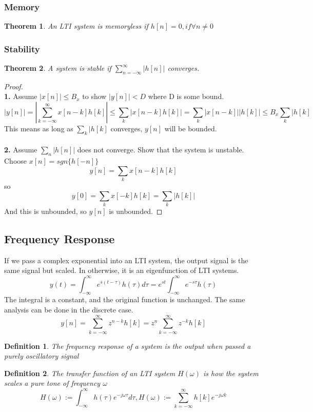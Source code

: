 \documentclass{article}
\newtheorem{theorem}{Theorem}
\newtheorem{definition}{Definition}
\newtheorem{proof}{Proof}
\begin{document}
\subsubsection{Memory}
\begin{theorem}
    An LTI system is memoryless if $h[n]=0, if \forall n \ne 0$
\end{theorem}
\subsubsection{Stability}
\begin{theorem}
    A system is stable if $\sum_{n=-\infty}^{\infty}{|h[n]|}$ converges.
\end{theorem}
\begin{proof}
    \textbf{\\1. } Assume $|x[n]| \le B_x$ to show $|y[n]| < D$ where D is some bound.
    $$|y[n]| = |\sum_{k=-\infty}^{\infty}{x[n-k]h[k]}| \le \sum_{k}{|x[n-k]h[k]|} = \sum_{k}{|x[n-k]||h[k]|}\le B_x\sum_{k}{|h[k]}$$
    This means as long as $\sum_{k}{|h[k]}$ converges, $y[n]$ will be bounded.\\
    \textbf{\\2. } Assume $\sum_{n}{|h[n]|}$ does not converge. Show that the system is unstable.
    Choose $x[n]=sgn\{h[-n]\}$
    $$y[n]=\sum_{k}{x[n-k]h[k]}$$ so 
    $$y[0] = \sum_{k}{x[-k]h[k]} = \sum_{k}{|h[k]|}$$
    And this is unbounded, so $y[n]$ is unbounded.
\end{proof}
\subsection{Frequency Response}
If we pass a complex exponential into an LTI system, the output signal is the same signal but scaled.
In otherwise, it is an eigenfunction of LTI systems.
$$y(t)=\int_{-\infty}^{\infty}{e^{s(t-\tau)}h(\tau)d\tau}=e^{st}\int_{-\infty}^{\infty}{e^{-s\tau}h(\tau)}$$
The integral is a constant, and the original function is unchanged.
The same analysis can be done in the discrete case.
$$y[n]=\sum_{k=-\infty}^{\infty}z^{n-k}h[k] = z^n \sum_{k=-\infty}^{\infty}z^{-k}h[k]$$
\begin{definition}
    The frequency response of a system is the output when passed a purely oscillatory signal
\end{definition}
\begin{definition}
    The transfer function of an LTI system $H(\omega)$ is how the system scales a pure tone of frequency $\omega$
    $$H(\omega):=\int_{-\infty}^{\infty}{h(\tau)e^{-j\omega\tau}d\tau}, H(\omega):= \sum_{k=-\infty}^{\infty}{h[k]e^{-j\omega k}}$$
\end{definition}
\end{document}
